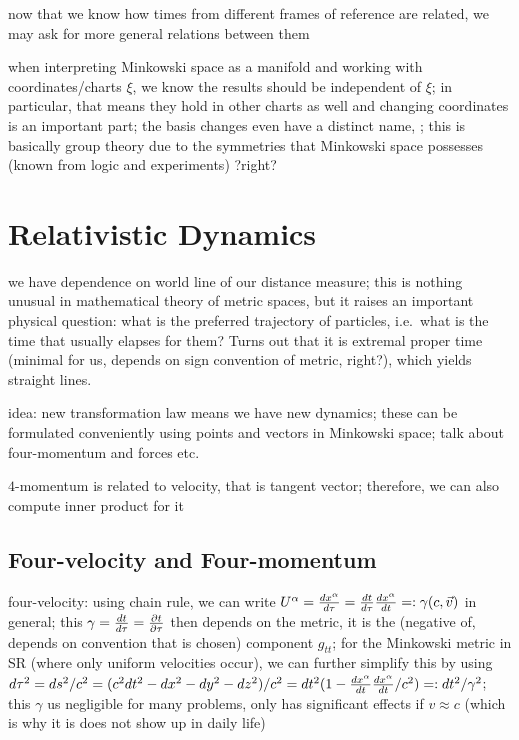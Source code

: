 now that we know how times from different frames of reference are related, we may ask for more general relations between them


when interpreting Minkowski space as a manifold and working with coordinates/charts $\xi$, we know the results should be independent of $\xi$; in particular, that means they hold in other charts as well and changing coordinates is an important part; the basis changes even have a distinct name, ; this is basically group theory due to the symmetries that Minkowski space possesses (known from logic and experiments) ?right?




\newpage



	\section{Relativistic Dynamics}
we have dependence on world line of our distance measure; this is nothing unusual in mathematical theory of metric spaces, but it raises an important physical question: what is the preferred trajectory of particles, i.e.~what is the time that usually elapses for them? Turns out that it is extremal proper time (minimal for us, depends on sign convention of metric, right?), which yields straight lines.


idea: new transformation law means we have new dynamics; these can be formulated conveniently using points and vectors in Minkowski space; talk about four-momentum and forces etc.

$4$-momentum is related to velocity, that is tangent vector; therefore, we can also compute inner product for it



		\subsection{Four-velocity and Four-momentum}
four-velocity: using chain rule, we can write $U^\alpha = \dv{x^\alpha}{\tau} = \dv{t}{\tau} \dv{x^\alpha}{t} =: \gamma (c, \vec{v})$ in general; this $\gamma = \dv{t}{\tau} = \pdv{t}{\tau}$ then depends on the metric, it is the (negative of, depends on convention that is chosen) component $g_{tt}$; for the Minkowski metric in SR (where only uniform velocities occur), we can further simplify this by using $d\tau^2 = ds^2 / c^2 = (c^2 dt^2 - dx^2 - dy^2 - dz^2) / c^2 = dt^2 (1 - \dv{x^\alpha}{t} \dv{x^\alpha}{t} / c^2) =: dt^2 / \gamma^2$; this $\gamma$ us negligible for many problems, only has significant effects if $v \approx c$ (which is why it is does not show up in daily life)



